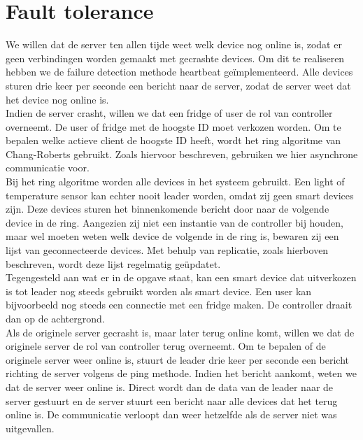 \documentclass[a4paper]{article}
\begin{document}
	\section{Fault tolerance}
		We willen dat de server ten allen tijde weet welk device nog online is, zodat er geen verbindingen worden gemaakt met gecrashte devices. Om dit te realiseren hebben we de failure detection methode heartbeat ge\"implementeerd. Alle devices sturen drie keer per seconde een bericht naar de server, zodat de server weet dat het device nog online is. \\
		Indien de server crasht, willen we dat een fridge of user de rol van controller overneemt. De user of fridge met de hoogste ID moet verkozen worden. Om te bepalen welke actieve client de hoogste ID heeft, wordt het ring algoritme van Chang-Roberts gebruikt. Zoals hiervoor beschreven, gebruiken we hier asynchrone communicatie voor. \\
		Bij het ring algoritme worden alle devices in het systeem gebruikt. Een light of temperature sensor kan echter nooit leader worden, omdat zij geen smart devices zijn. Deze devices sturen het binnenkomende bericht door naar de volgende device in de ring. Aangezien zij niet een instantie van de controller bij houden, maar wel moeten weten welk device de volgende in de ring is, bewaren zij een lijst van geconnecteerde devices. Met behulp van replicatie, zoals hierboven beschreven, wordt deze lijst regelmatig ge\"updatet. \\
		Tegengesteld aan wat er in de opgave staat, kan een smart device dat uitverkozen is tot leader nog steeds gebruikt worden als smart device. Een user kan bijvoorbeeld nog steeds een connectie met een fridge maken. De controller draait dan op de achtergrond. \\
		Als de originele server gecrasht is, maar later terug online komt, willen we dat de originele server de rol van controller terug overneemt. Om te bepalen of de originele server weer online is, stuurt de leader drie keer per seconde een bericht richting de server volgens de ping methode. Indien het bericht aankomt, weten we dat de server weer online is. Direct wordt dan de data van de leader naar de server gestuurt en de server stuurt een bericht naar alle devices dat het terug online is. De communicatie verloopt dan weer hetzelfde als de server niet was uitgevallen.
	
\end{document}
